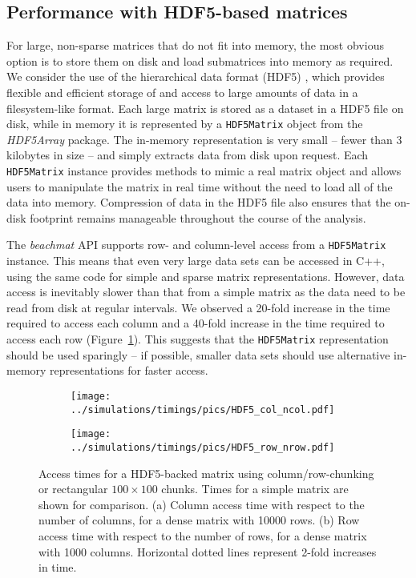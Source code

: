 \documentclass[10pt,letterpaper]{article}
\newcommand{\beachmat}{\textit{beachmat}}
\newcommand{\code}[1]{\texttt{#1}}
\begin{document}
\subsection*{Performance with HDF5-based matrices}
For large, non-sparse matrices that do not fit into memory, the most obvious option is to store them on disk and load submatrices into memory as required.
We consider the use of the hierarchical data format (HDF5) \cite{hdf5}, which provides flexible and efficient storage of and access to large amounts of data in a filesystem-like format.
Each large matrix is stored as a dataset in a HDF5 file on disk, while in memory it is represented by a \code{HDF5Matrix} object from the \textit{HDF5Array} package.
The in-memory representation is very small -- fewer than 3 kilobytes in size -- and simply extracts data from disk upon request.
Each \code{HDF5Matrix} instance provides methods to mimic a real matrix object and allows users to manipulate the matrix in real time without the need to load all of the data into memory.
Compression of data in the HDF5 file also ensures that the on-disk footprint remains manageable throughout the course of the analysis.

The \beachmat{} API supports row- and column-level access from a \code{HDF5Matrix} instance.
This means that even very large data sets can be accessed in C++, using the same code for simple and sparse matrix representations.
However, data access is inevitably slower than that from a simple matrix as the data need to be read from disk at regular intervals.
We observed a 20-fold increase in the time required to access each column and a 40-fold increase in the time required to access each row (Figure~\ref{fig:hdf5time}).
This suggests that the \code{HDF5Matrix} representation should be used sparingly -- if possible, smaller data sets should use alternative in-memory representations for faster access.

\begin{figure}[bt]
    \begin{subfigure}[b]{0.49\textwidth}
        \texttt{[image: ../simulations/timings/pics/HDF5\_col\_ncol.pdf]}
        \caption{}
    \end{subfigure}
    \begin{subfigure}[b]{0.49\textwidth}
        \texttt{[image: ../simulations/timings/pics/HDF5\_row\_nrow.pdf]}
        \caption{}
    \end{subfigure}
    \caption{Access times for a HDF5-backed matrix using column/row-chunking or rectangular $100\times100$ chunks.
        Times for a simple matrix are shown for comparison.
        (a) Column access time with respect to the number of columns, for a dense matrix with 10000 rows.
        (b) Row access time with respect to the number of rows, for a dense matrix with 1000 columns.
        Horizontal dotted lines represent 2-fold increases in time.
    }
    \label{fig:hdf5time}
\end{figure}
\end{document}
